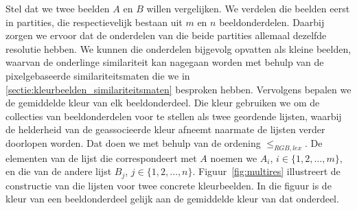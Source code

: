 Stel dat we twee beelden $A$ en $B$ willen
vergelijken. We verdelen
die beelden eerst in partities, die respectievelijk bestaan uit
$m$ en $n$ beeldonderdelen. Daarbij zorgen we ervoor dat de onderdelen
van die beide partities allemaal dezelfde resolutie hebben. We kunnen die onderdelen bijgevolg 
opvatten als kleine beelden, waarvan de onderlinge similariteit kan nagegaan worden met behulp 
van de pixelgebaseerde similariteitsmaten die we in \ref{sectie:kleurbeelden_similariteitsmaten}
besproken hebben.
Vervolgens bepalen we de gemiddelde kleur van elk beeldonderdeel. Die kleur gebruiken we om
de collecties van beeldonderdelen voor te stellen als twee geordende lijsten, waarbij de 
helderheid van de geassocieerde kleur afneemt naarmate de lijsten verder doorlopen worden.
Dat doen we met behulp van de ordening $\leq_{RGB,lex}$. 
De elementen van de lijst die correspondeert met $A$ noemen 
we $A_i$, $i \in \{1,2,\ldots,m\}$, en die van de andere lijst $B_j$, $j \in \{1,2,\ldots,n\}$.
Figuur~\ref{fig:multires} illustreert de constructie van die lijsten voor twee concrete
kleurbeelden. In die figuur is de kleur van een beeldonderdeel gelijk aan de gemiddelde 
kleur van dat onderdeel.

